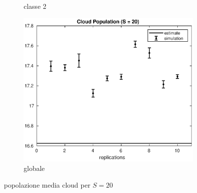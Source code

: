 \begin{figure}[!h]
\begin{subfigure}[t]{0.49\textwidth}
\caption{classe 2}
\label{20_n2cloud}
\end{subfigure}
%
\begin{subfigure}[t]{0.5\textwidth}
\includegraphics[width=\textwidth]{figures/simul/20_500K_ncloud}
\caption{globale}
\label{20_ncloud}
\end{subfigure}
%
\caption{popolazione media cloud per $S = 20$}
\end{figure}
%

